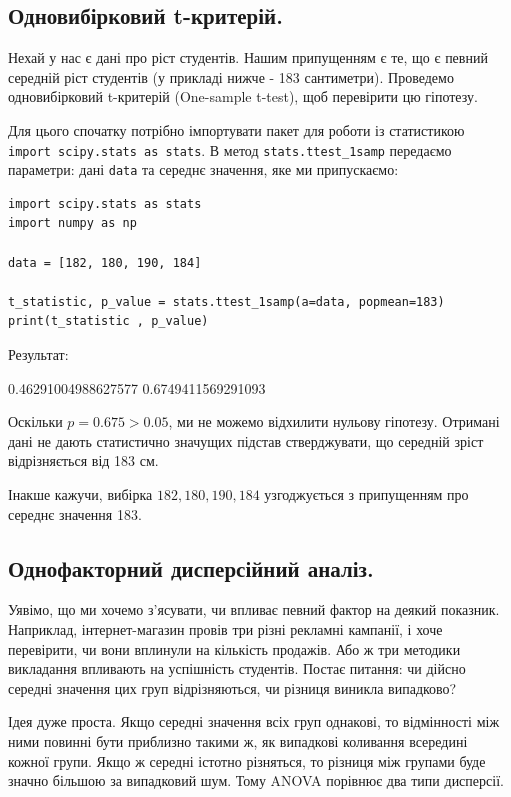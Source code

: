 \subsection{Одновибірковий t-критерій.}

Нехай у нас є дані про ріст студентів. Нашим припущенням є те, що є певний середній ріст студентів (у прикладі нижче - 183 сантиметри). Проведемо одновибірковий t-критерій (One-sample t-test), щоб перевірити цю гіпотезу.

Для цього спочатку потрібно імпортувати пакет для роботи із статистикою \verb|import scipy.stats as stats|. В метод \verb|stats.ttest_1samp| передаємо параметри: дані \verb|data| та середнє значення, яке ми припускаємо:

\begin{lstlisting}
import scipy.stats as stats 
import numpy as np
  
data = [182, 180, 190, 184]
  
t_statistic, p_value = stats.ttest_1samp(a=data, popmean=183) 
print(t_statistic , p_value)
\end{lstlisting}

Результат:

\begin{console}
0.46291004988627577 0.6749411569291093
\end{console}

Оскільки $p = 0.675 > 0.05$, ми не можемо відхилити нульову гіпотезу. Отримані дані не дають статистично значущих підстав стверджувати, що середній зріст відрізняється від 183 см.

Інакше кажучи, вибірка $182, 180, 190, 184$ узгоджується з припущенням про середнє значення 183.


\subsection{Однофакторний дисперсійний аналіз.}

Уявімо, що ми хочемо з'ясувати, чи впливає певний фактор на деякий показник. Наприклад, інтернет-магазин провів три різні рекламні кампанії, і хоче перевірити, чи вони вплинули на кількість продажів. Або ж три методики викладання впливають на успішність студентів. Постає питання: чи дійсно середні значення цих груп відрізняються, чи різниця виникла випадково?

Ідея дуже проста. Якщо середні значення всіх груп однакові, то відмінності між ними повинні бути приблизно такими ж, як випадкові коливання всередині кожної групи. Якщо ж середні істотно різняться, то різниця між групами буде значно більшою за випадковий шум. Тому ANOVA порівнює два типи дисперсії. 

